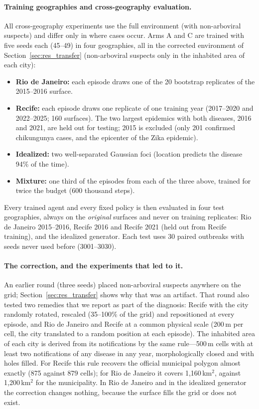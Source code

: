 \documentclass[11pt,a4paper]{article}
\begin{document}
\paragraph{Training geographies and cross-geography evaluation.} All cross-geography experiments use the full environment (with non-arboviral suspects) and differ only in where cases occur. Arms A and C are trained with five seeds each (45--49) in four geographies, all in the corrected environment of Section~\ref{sec:res_transfer} (non-arboviral suspects only in the inhabited area of each city):
\begin{itemize}
    \item \textbf{Rio de Janeiro:} each episode draws one of the 20 bootstrap replicates of the 2015--2016 surface.
    \item \textbf{Recife:} each episode draws one replicate of one training year (2017--2020 and 2022--2025; 160 surfaces). The two largest epidemics with both diseases, 2016 and 2021, are held out for testing; 2015 is excluded (only 201 confirmed chikungunya cases, and the epicenter of the Zika epidemic).
    \item \textbf{Idealized:} two well-separated Gaussian foci (location predicts the disease 94\% of the time).
    \item \textbf{Mixture:} one third of the episodes from each of the three above, trained for twice the budget (600 thousand steps).
\end{itemize}
Every trained agent and every fixed policy is then evaluated in four test geographies, always on the \emph{original} surfaces and never on training replicates: Rio de Janeiro 2015--2016, Recife 2016 and Recife 2021 (held out from Recife training), and the idealized generator. Each test uses 30 paired outbreaks with seeds never used before (3001--3030).

\paragraph{The correction, and the experiments that led to it.} An earlier round (three seeds) placed non-arboviral suspects anywhere on the grid; Section~\ref{sec:res_transfer} shows why that was an artifact. That round also tested two remedies that we report as part of the diagnosis: Recife with the city randomly rotated, rescaled (35--100\% of the grid) and repositioned at every episode, and Rio de Janeiro and Recife at a common physical scale (200\,m per cell, the city translated to a random position at each episode). The inhabited area of each city is derived from its notifications by the same rule---500\,m cells with at least two notifications of any disease in any year, morphologically closed and with holes filled. For Recife this rule recovers the official municipal polygon almost exactly (875 against 879 cells); for Rio de Janeiro it covers 1{,}160\,km$^2$, against 1{,}200\,km$^2$ for the municipality. In Rio de Janeiro and in the idealized generator the correction changes nothing, because the surface fills the grid or does not exist.
\end{document}
